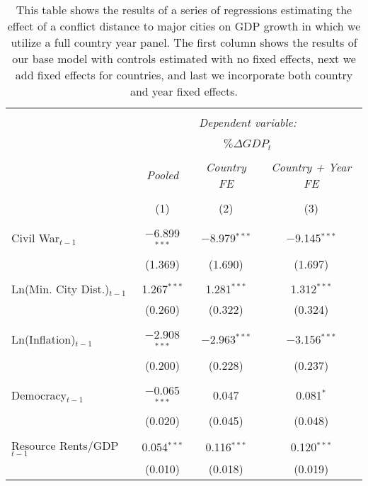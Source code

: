 \begin{table}[!htbp] \centering 
  \caption{This table shows the results of a series of regressions estimating the effect of a conflict distance to major cities on GDP growth in which we utilize a full country year panel. The first column shows the results of our base model with controls estimated with no fixed effects, next we add fixed effects for countries, and last we incorporate both country and year fixed effects.} 
  \label{tab:cityFullPiecewiseFE} 
\begin{tabular}{@{\extracolsep{5pt}}lccc} 
\\[-1.8ex]\hline 
\hline \\[-1.8ex] 
 & \multicolumn{3}{c}{\textit{Dependent variable:}} \\ 
\cline{2-4} 
\\[-1.8ex] & \multicolumn{3}{c}{$\% \Delta GDP_{t}$} \\ 
\\[-1.8ex] & \textit{Pooled} 
 & \textit{Country FE} & \textit{Country + Year FE} \\ 
\\[-1.8ex] & (1) & (2) & (3)\\ 
\hline \\[-1.8ex] 
 Civil War$_{t-1}$ & $-$6.899$^{***}$ & $-$8.979$^{***}$ & $-$9.145$^{***}$ \\ 
  & (1.369) & (1.690) & (1.697) \\ 
  & & & \\ 
 Ln(Min. City Dist.)$_{t-1}$ & 1.267$^{***}$ & 1.281$^{***}$ & 1.312$^{***}$ \\ 
  & (0.260) & (0.322) & (0.324) \\ 
  & & & \\ 
 Ln(Inflation)$_{t-1}$ & $-$2.908$^{***}$ & $-$2.963$^{***}$ & $-$3.156$^{***}$ \\ 
  & (0.200) & (0.228) & (0.237) \\ 
  & & & \\ 
 Democracy$_{t-1}$ & $-$0.065$^{***}$ & 0.047 & 0.081$^{*}$ \\ 
  & (0.020) & (0.045) & (0.048) \\ 
  & & & \\ 
 Resource Rents/GDP$_{t-1}$ & 0.054$^{***}$ & 0.116$^{***}$ & 0.120$^{***}$ \\ 
  & (0.010) & (0.018) & (0.019) \\ 

\end{tabular}
\end{table}
